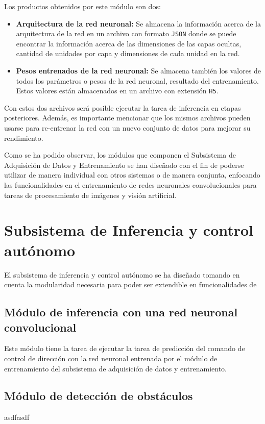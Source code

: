     Los productos obtenidos por este módulo son dos:
    
    \begin{itemize}
        \item \textbf{Arquitectura de la red neuronal:} Se almacena la información acerca de la arquitectura de la red en un archivo con formato \lstinline{JSON} donde se puede encontrar la información acerca de las dimensiones de las capas ocultas, cantidad de unidades por capa y dimensiones de cada unidad en la red.
        \item \textbf{Pesos entrenados de la red neuronal:} Se almacena también los valores de todos los parámetros o pesos de la red neuronal, resultado del entrenamiento. Estos valores están almacenados en un archivo con extensión \lstinline{H5}. 
    \end{itemize}

    Con estos dos archivos será posible ejecutar la tarea de inferencia en etapas posteriores. Además, es importante mencionar que 
    los mismos archivos pueden usarse para re-entrenar la red con un nuevo conjunto de datos para mejorar su rendimiento.

    Como se ha podido observar, los módulos que componen el Subsistema de Adquisición de Datos y Entrenamiento se han diseñado 
    con el fin de poderse utilizar de manera individual con otros sistemas o de manera conjunta, enfocando las funcionalidades 
    en el entrenamiento de redes neuronales convolucionales para tareas de procesamiento de imágenes y visión artificial.

\section{Subsistema de Inferencia y control autónomo}
El subsistema de inferencia y control autónomo se ha diseñado tomando en cuenta la modularidad necesaria para poder ser 
extendible en funcionalidades de 
    \subsection{Módulo de inferencia con una red neuronal convolucional}
    Este módulo tiene la tarea de ejecutar la tarea de predicción del comando de control de dirección con la red neuronal 
    entrenada por el módulo de entrenamiento del subsistema de adquisición de datos y entrenamiento.
    \subsection{Módulo de detección de obstáculos}
    asdfasdf
